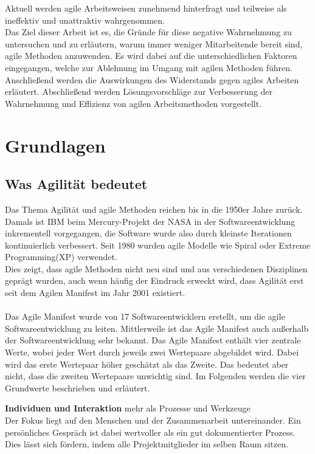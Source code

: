 \documentclass[ngerman]{seminarvorlage}
\begin{document}
Aktuell werden agile Arbeitsweisen zunehmend hinterfragt und teilweise als ineffektiv und unattraktiv wahrgenommen.\\
Das Ziel dieser Arbeit ist es, die Gründe für diese negative Wahrnehmung zu untersuchen und zu erläutern, warum immer weniger Mitarbeitende bereit sind, agile Methoden anzuwenden. Es wird dabei auf die unterschiedlichen Faktoren eingegangen, welche zur Ablehnung im Umgang mit agilen Methoden führen. Anschließend werden die Auswirkungen des Widerstands gegen agiles Arbeiten erläutert. Abschließend werden Lösungsvorschläge zur Verbesserung der Wahrnehmung und Effizienz von agilen Arbeitsmethoden vorgestellt.



\section{Grundlagen}
\subsection{Was Agilität bedeutet}
Das Thema Agilität und agile Methoden reichen bis in die 1950er Jahre zurück. Damals ist IBM beim Mercury-Projekt der NASA in der Softwareentwicklung inkrementell vorgegangen, die Software wurde also durch kleinste Iterationen kontinuierlich verbessert. Seit 1980 wurden agile Modelle wie Spiral oder Extreme Programming(XP) verwendet.\\
Dies zeigt, dass agile Methoden nicht neu sind und aus verschiedenen Disziplinen geprägt wurden, auch wenn häufig der Eindruck erweckt wird, dass Agilität erst seit dem Agilen Manifest im Jahr 2001 existiert.\cite{Simschek.2022}\\\\
Das Agile Manifest wurde von 17 Softwareentwicklern erstellt, um die agile Softwareentwicklung zu leiten. Mittlerweile ist das Agile Manifest auch außerhalb der Softwareentwicklung sehr bekannt.
Das Agile Manifest enthält vier zentrale Werte, wobei jeder Wert durch jeweils zwei Wertepaare abgebildet wird. Dabei wird das erste Wertepaar höher geschätzt als das Zweite. Das bedeutet aber nicht, dass die zweiten Wertepaare unwichtig sind. Im Folgenden werden die vier Grundwerte beschrieben und erläutert.

\textbf{Individuen und Interaktion} mehr als Prozesse und Werkzeuge\\
Der Fokus liegt auf den Menschen und der Zusammenarbeit untereinander. Ein persönliches Gespräch ist dabei wertvoller als ein gut dokumentierter Prozess. Dies lässt sich fördern, indem alle Projektmitglieder im selben Raum sitzen.
\end{document}
